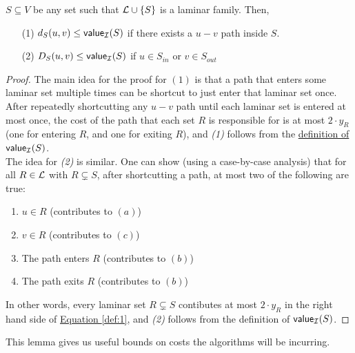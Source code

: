 	\begin{lemma}\label{lemm:2:D-val}
		$S\subseteq V$ be any set such that $\mathcal{L} \cup \{S\}$ is a laminar family.
		Then,
		\begin{enumerate}
			\item[(1)] $d_S(u,v)\leq \textsf{\textup{value}}_{\mathcal{I}}(S)$ if there exists a $u-v$ path inside $S$.
			\item[(2)] $D_S(u,v)\leq \textsf{\textup{value}}_{\mathcal{I}}(S)$ if $u\in S_{in}$ or $v\in S_{out}$
		\end{enumerate}
	\end{lemma}
	\begin{proof}
		The main idea for the proof for $(1)$ is that a path that enters some laminar set multiple times can be shortcut to just enter that laminar set once.
		After repeatedly shortcutting any $u-v$ path until each laminar set is entered at most once, the cost of the path that each set $R$ is responsible for is at most $2\cdot y_R$ (one for entering $R$, and one for exiting $R$), and \textit{(1)} follows from the \hyperref[def:value]{definition of $\textsf{\textup{value}}_{\mathcal{I}}(S)$}.\\
		The idea for \textit{(2)} is similar. One can show (using a case-by-case analysis) that for all $R\in \mathcal{L}$ with $R\subsetneq S$, after shortcutting a path, at most two of the following are true:
		\begin{enumerate}
			\item $u\in R$ (contributes to \hyperref[def:D]{$(a)$})
			\item $v\in R$ (contributes to \hyperref[def:D]{$(c)$})
			\item The path enters $R$ (contributes to \hyperref[def:D]{$(b)$})
			\item The path exits $R$ (contributes to \hyperref[def:D]{$(b)$})
		\end{enumerate}
		In other words, every laminar set $R\subsetneq S$ contibutes at most $2\cdot y_R$ in the right hand side of \hyperref[def:1]{Equation \ref{def:1}}, and \textit{(2)} follows from the definition of $\textsf{\textup{value}}_{\mathcal{I}}(S)$.
	\end{proof}
	
	This lemma gives us useful bounds on costs the algorithms will be incurring.

